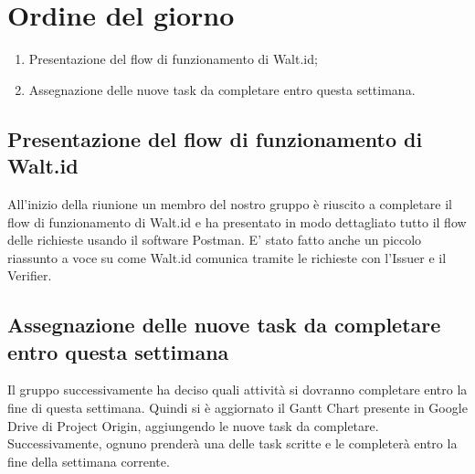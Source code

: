 \section{Ordine del giorno}
\begin{enumerate}
\item Presentazione del flow di funzionamento di Walt.id;
\item Assegnazione delle nuove task da completare entro questa settimana.
\end{enumerate}
\subsection{Presentazione del flow di funzionamento di Walt.id}
All'inizio della riunione un membro del nostro gruppo è riuscito a completare il flow di funzionamento di Walt.id e ha presentato in modo dettagliato tutto il flow delle richieste usando il software Postman\glo. E' stato fatto anche un piccolo riassunto a voce su come Walt.id comunica tramite le richieste con l'Issuer e il Verifier.
\subsection{Assegnazione delle nuove task da completare entro questa settimana}
Il gruppo successivamente ha deciso quali attività si dovranno completare entro la fine di questa settimana. Quindi si è aggiornato il Gantt Chart presente in Google Drive di Project Origin, aggiungendo le nuove task da completare.\\
Successivamente, ognuno prenderà una delle task scritte e le completerà entro la fine della settimana corrente.